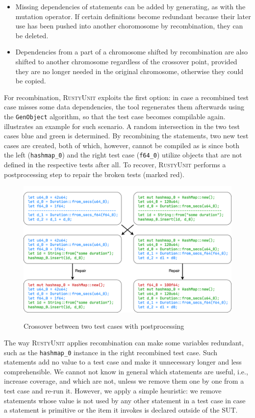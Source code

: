 \documentclass[paper=a4,%
  twoside,%
  BCOR4mm,%
  abstract=true,%
  toc=bibliography,%
  chapterprefix=true,%
  toc=bibliographynumbered,%
  open=right,%
  english,%
  pagesize=pdftex]{scrreprt}
\newcommand{\tech}{\textsc{RustyUnit}\xspace}
\newcommand{\sut}{\ac{SUT}\xspace}
\begin{document}
\begin{itemize}
    \item Missing dependencies of statements can be added by generating, as with the mutation operator. If certain definitions become redundant because their later use has been pushed into another choromosome by recombination, they can be deleted.
    \item Dependencies from a part of a chromosome shifted by recombination are also shifted to another chromosome regardless of the crossover point, provided they are no longer needed in the original chromosome, otherwise they could be copied.
\end{itemize}

For recombination, \tech exploits the first option: in case a recombined test case misses some data dependencies, the tool regenerates them afterwards using the \texttt{GenObject} algorithm, so that the test case becomes compilable again.  illustrates an example for such scenario. A random intersection in the two test cases blue and green is determined. By recombining the statements, two new test cases are created, both of which, however, cannot be compiled as is since both the left (\texttt{hashmap\string_0}) and the right test case (\texttt{f64\string_0}) utilize objects that are not defined in the respective tests after all. To recover, \tech performs a postprocessing step to repair the broken tests (marked red).

\begin{figure}[h]
\caption{Crossover between two test cases with postprocessing}
\centering
\includegraphics[width=\textwidth]{crossover}
\label{fig:crossover-example}
\end{figure}

The way \tech applies recombination can make some variables redundant, such as the \texttt{hashmap\string_0} instance in the right recombined test case. Such statements add no value to a test case and make it unnecessary longer and less comprehensible. We cannot not know in general which statements are useful, i.e., increase coverage, and which are not, unless we remove them one by one from a test case and re-run it. However, we apply a simple heuristic: we remove statements whose value is not used by any other statement in a test case in case a statement is primitive or the item it invokes is declared outside of the \sut.
\end{document}
